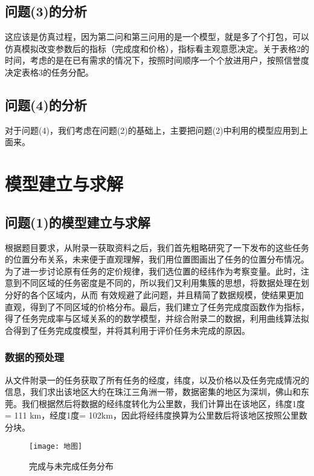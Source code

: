 \documentclass{ctexart}
\begin{document}
\subsection{问题(3)的分析}
这应该是仿真过程，因为第二问和第三问用的是一个模型，就是多了个打包，可以仿真模拟改变参数后的指标（完成度和价格），指标看主观意愿决定。关于表格2的时间，考虑的是在已有需求的情况下，按照时间顺序一个个放进用户，按照信誉度决定表格3的任务分配。
\subsection{问题(4)的分析}
对于问题(4)，我们考虑在问题(2)的基础上，主要把问题(2)中利用的模型应用到上面来。




\section{模型建立与求解}
\subsection{问题(1)的模型建立与求解}
根据题目要求，从附录一获取资料之后，我们首先粗略研究了一下发布的这些任务的位置分布关系，未来便于直观理解，我们用位置图画出了任务的位置分布情况。为了进一步讨论原有任务的定价规律，我们选位置的经纬作为考察变量。此时，注意到不同区域的任务密度是不同的，所以我们又利用集簇的思想，将数据处理在划分好的各个区域内，从而 有效规避了此问题，并且精简了数据规模，使结果更加直观，得到了不同区域的价格分布。最后，我们建立了任务完成度函数作为指标，得了任务完成率与区域关系的的数学模型，并综合附录二的数据，利用曲线算法拟合得到了任务完成度模型，并将其利用于评价任务未完成的原因。
\subsubsection{数据的预处理}
从文件附录一的任务获取了所有任务的经度，纬度，以及价格以及任务完成情况的信息，我们求出该地区大约在珠江三角洲一带，数据密集的地区为深圳，佛山和东莞。我们根据然后将数据的经纬度转化为公里数，我们计算出在该地区，纬度1度= 111 km，经度1度= 102km，因此将经纬度换算为公里数后将该地区按照公里数分块。
\begin{figure}[htbp] 
\centering
\texttt{[image: 地图]} 
\caption{完成与未完成任务分布}
\end{figure}
\end{document}
